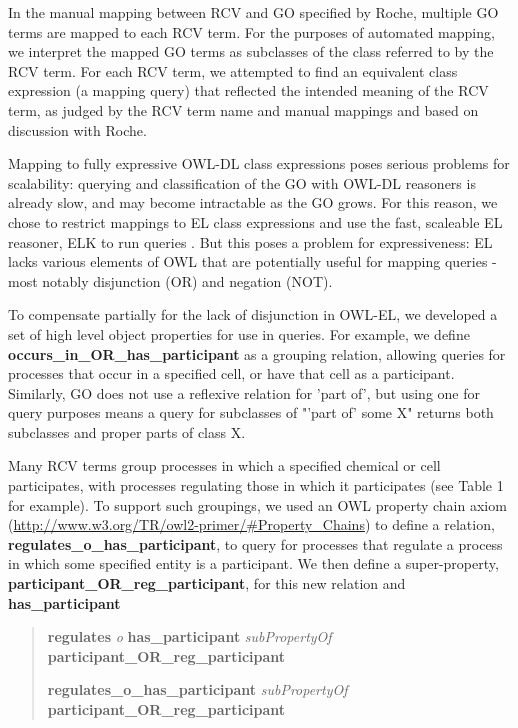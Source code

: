 \documentclass[runningheads,a4paper]{llncs}
\begin{document}
{{In the manual mapping between RCV and \ac{GO} specified by Roche, multiple \ac{GO} terms are mapped to each RCV term. For the purposes of automated mapping, we interpret the mapped \ac{GO} terms as subclasses of the class referred to by the RCV term. For each RCV term, we attempted to find an equivalent class expression (a mapping query) that reflected the intended meaning of the RCV term, as judged by the RCV term name and manual mappings and based on discussion with Roche.

Mapping to fully expressive OWL-DL class expressions poses serious problems for scalability: querying and classification of the \ac{GO} with OWL-DL reasoners is already slow, and may become intractable as the \ac{GO} grows.  For this reason, we chose to restrict mappings to EL class expressions and use the fast, scaleable EL reasoner, ELK to run queries \cite{kazakov2012}. But this poses a problem for expressiveness: EL lacks various elements of OWL that are potentially useful for mapping queries - most notably disjunction (OR) and negation (NOT).  

To compensate partially for the lack of disjunction in OWL-EL, we developed a set of high level object properties for use in queries. For example, we define \textbf{occurs\_in\_OR\_has\_participant} as a grouping relation, allowing queries for processes that occur in a specified cell, or have that cell as a participant. Similarly, \ac{GO} does not use a reflexive relation for 'part of', but using one for query purposes means a query for subclasses of  "'part of' some X" returns both subclasses and proper parts of class X.

Many RCV terms group processes in which a specified chemical or cell participates, with processes regulating those in which it participates (see Table 1 for example). To support such groupings, we used an OWL property chain axiom (\url{http://www.w3.org/TR/owl2-primer/#Property_Chains}) to define a relation, \textbf{regulates\_o\_has\_participant}, to query for processes that regulate a process in which some specified entity is a participant. We then define a super-property, \textbf{participant\_OR\_reg\_participant}, for this new relation and \textbf{has\_participant}

\begin{quote} %
\textbf{regulates} \textit{o} \textbf{has\_participant} \textit{subPropertyOf} \textbf{participant\_OR\_reg\_participant}

\textbf{regulates\_o\_has\_participant} \textit{subPropertyOf} \textbf{participant\_OR\_reg\_participant}


\end{quote}}}
\end{document}
